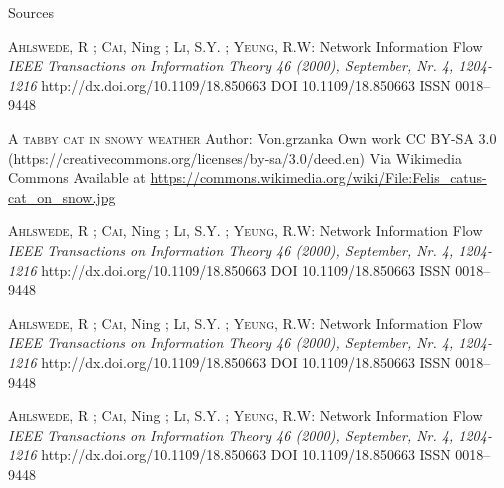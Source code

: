 \multipleslidetrue
\begin{frame}[allowframebreaks]{Sources}   

  \begin{thebibliography}{9}  

    \Fontvi

    \textsc{Ahlswede}, R ; \textsc{Cai}, Ning  ; \textsc{Li},
      S.Y. ; \textsc{Yeung},  R.W:
    \newblock Network Information Flow
    \emph{IEEE Transactions on Information Theory 46 (2000), September, Nr. 4, 1204-1216}
    \newblock http://dx.doi.org/10.1109/18.850663
    \newblock DOI 10.1109/18.850663
    \newblock ISSN 0018–9448

    \textsc{A tabby cat in snowy weather}
    \newblock Author: Von.grzanka
    \newblock Own work
    \newblock CC BY-SA 3.0 (https://creativecommons.org/licenses/by-sa/3.0/deed.en)
    \newblock Via Wikimedia Commons
    \newblock Available at \url{https://commons.wikimedia.org/wiki/File:Felis_catus-cat_on_snow.jpg}

    \textsc{Ahlswede}, R ; \textsc{Cai}, Ning  ; \textsc{Li},
      S.Y. ; \textsc{Yeung},  R.W:
    \newblock Network Information Flow
    \emph{IEEE Transactions on Information Theory 46 (2000), September, Nr. 4, 1204-1216}
    \newblock http://dx.doi.org/10.1109/18.850663
    \newblock DOI 10.1109/18.850663
    \newblock ISSN 0018–9448

    \textsc{Ahlswede}, R ; \textsc{Cai}, Ning  ; \textsc{Li},
      S.Y. ; \textsc{Yeung},  R.W:
    \newblock Network Information Flow
    \emph{IEEE Transactions on Information Theory 46 (2000), September, Nr. 4, 1204-1216}
    \newblock http://dx.doi.org/10.1109/18.850663
    \newblock DOI 10.1109/18.850663
    \newblock ISSN 0018–9448

    \textsc{Ahlswede}, R ; \textsc{Cai}, Ning  ; \textsc{Li},
      S.Y. ; \textsc{Yeung},  R.W:
    \newblock Network Information Flow
    \emph{IEEE Transactions on Information Theory 46 (2000), September, Nr. 4, 1204-1216}
    \newblock http://dx.doi.org/10.1109/18.850663
    \newblock DOI 10.1109/18.850663
    \newblock ISSN 0018–9448


\end{thebibliography}
\end{frame}
